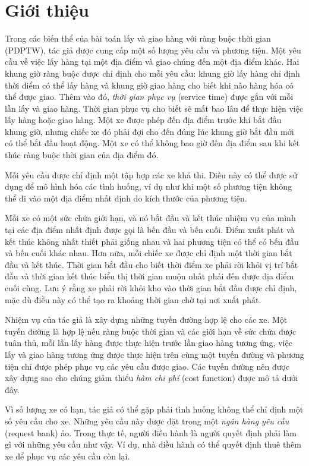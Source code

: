 \chapter*{Giới thiệu}
Trong các biến thể của bài toán lấy và giao hàng với ràng buộc thời gian (PDPTW), tác giả được cung cấp một số lượng yêu cầu và phương tiện. Một yêu cầu về việc lấy hàng tại một địa điểm và giao chúng đến một địa điểm khác. Hai khung giờ ràng buộc được chỉ định cho mỗi yêu cầu: khung giờ lấy hàng chỉ định thời điểm có thể lấy hàng và khung giờ giao hàng cho biết khi nào hàng hóa có thể được giao. Thêm vào đó, \textit{thời gian phục vụ} (service time) được gắn với mỗi lần lấy và giao hàng. Thời gian phục vụ cho biết sẽ mất bao lâu để thực hiện việc lấy hàng hoặc giao hàng. Một xe được phép đến địa điểm trước khi bắt đầu khung giờ, nhưng chiếc xe đó phải đợi cho đến đúng lúc khung giờ bắt đầu mới có thể bắt đầu hoạt động. Một xe có thể không bao giờ đến địa điểm sau khi kết thúc ràng buộc thời gian của địa điểm đó.

Mỗi yêu cầu được chỉ định một tập hợp các xe khả thi. Điều này có thể được sử dụng để mô hình hóa các tình huống, ví dụ như khi một số phương tiện không thể đi vào một địa điểm nhất định do kích thước của phương tiện.

Mỗi xe có một sức chứa giới hạn, và nó bắt đầu và kết thúc nhiệm vụ của mình tại các địa điểm nhất định được gọi là bến đầu và bến cuối. Điểm xuất phát và kết thúc không nhất thiết phải giống nhau và hai phương tiện có thể có bến đầu và bến cuối khác nhau. Hơn nữa, mỗi chiếc xe được chỉ định một thời gian bắt đầu và kết thúc. Thời gian bắt đầu cho biết thời điểm xe phải rời khỏi vị trí bắt đầu và thời gian kết thúc biểu thị thời gian muộn nhất phải đến được địa điểm cuối cùng. Lưu ý rằng xe phải rời khỏi kho vào thời gian bắt đầu được chỉ định, mặc dù điều này có thể tạo ra khoảng thời gian chờ tại nơi xuất phát.

Nhiệm vụ của tác giả là xây dựng những tuyến đường hợp lệ cho các xe. Một tuyến đường là hợp lệ nếu ràng buộc thời gian và các giới hạn về sức chứa được tuân thủ, mỗi lần lấy hàng được thực hiện trước lần giao hàng tương ứng, việc lấy và giao hàng tương ứng được thực hiện trên cùng một tuyến đường và phương tiện chỉ được phép phục vụ các yêu cầu được giao. Các tuyến đường nên được xây dựng sao cho chúng giảm thiểu \textit{hàm chi phí} (cost function) được mô tả dưới đây.

Vì số lượng xe có hạn, tác giả có thể gặp phải tình huống không thể chỉ định một số yêu cầu cho xe. Những yêu cầu này được đặt trong một \textit{ngân hàng yêu cầu} (request bank) ảo. Trong thực tế, người điều hành là người quyết định phải làm gì với những yêu cầu như vậy. Ví dụ, nhà điều hành có thể quyết định thuê thêm xe để phục vụ các yêu cầu còn lại.

